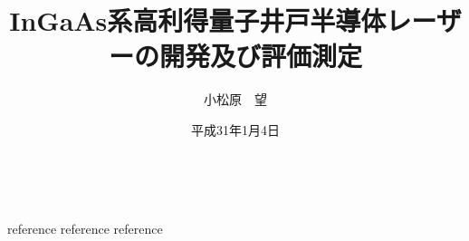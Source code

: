 \documentclass{jreport}
\title{InGaAs系高利得量子井戸半導体レーザーの開発及び評価測定}
\author{小松原　望}
\date{平成31年1月4日}
\begin{document}
\maketitle			%

\tableofcontents 	%
\listoffigures 		%
\listoftables　		%


\begin{thebibliography}{99}
 reference
 reference
 reference
%
\end{thebibliography}


\end{document}
